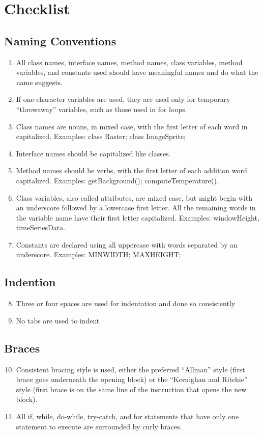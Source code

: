 
\section{Checklist}
	\subsection{Naming Conventions}
	\begin{enumerate}
		\item All class names, interface names, method names, class variables, method variables, and constants used should have meaningful names and do what the name suggests.
		\item If one-character variables are used, they are used only for temporary “throwaway” variables, such as those used in for loops.
		\item Class names are nouns, in mixed case, with the first letter of each word in capitalized. Examples: class Raster; class ImageSprite;
		\item Interface names should be capitalized like classes.
		\item Method names should be verbs, with the first letter of each addition word capitalized. Examples: getBackground(); computeTemperature().
		\item Class variables, also called attributes, are mixed case, but might begin with an underscore followed by a lowercase first letter. All the remaining words in the variable name have their first letter capitalized. Examples: \textunderscore windowHeight, timeSeriesData.
		\item Constants are declared using all uppercase with words separated by an underscore. Examples: MIN\textunderscore WIDTH; MAX\textunderscore HEIGHT;
	\end{enumerate}
	\subsection{Indention}
	\begin{enumerate}
		\setcounter{enumi}{7}
		\item Three or four spaces are used for indentation and done so consistently
		\item No tabs are used to indent
	\end{enumerate}
	\subsection{Braces}
	\begin{enumerate}
		\setcounter{enumi}{9}
		\item Consistent bracing style is used, either the preferred “Allman” style (first brace goes underneath the opening block) or the “Kernighan and Ritchie” style (first brace is on the same line of the instruction that opens the new block).
		\item All if, while, do-while, try-catch, and for statements that have only one statement to execute are surrounded by curly braces.
	\end{enumerate}
